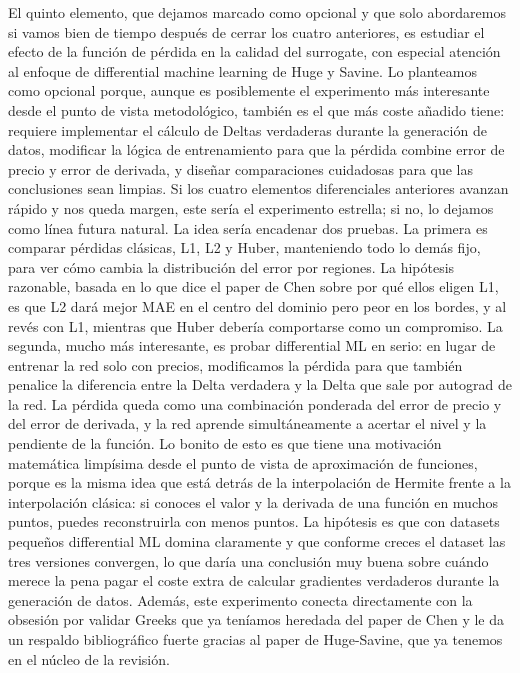 \documentclass[11pt,a4paper]{article}
\begin{document}
El quinto elemento, que dejamos marcado como opcional y que solo abordaremos si vamos bien de tiempo después de cerrar los cuatro anteriores, es estudiar el efecto de la función de pérdida en la calidad del surrogate, con especial atención al enfoque de differential machine learning de Huge y Savine. Lo planteamos como opcional porque, aunque es posiblemente el experimento más interesante desde el punto de vista metodológico, también es el que más coste añadido tiene: requiere implementar el cálculo de Deltas verdaderas durante la generación de datos, modificar la lógica de entrenamiento para que la pérdida combine error de precio y error de derivada, y diseñar comparaciones cuidadosas para que las conclusiones sean limpias. Si los cuatro elementos diferenciales anteriores avanzan rápido y nos queda margen, este sería el experimento estrella; si no, lo dejamos como línea futura natural. La idea sería encadenar dos pruebas. La primera es comparar pérdidas clásicas, L1, L2 y Huber, manteniendo todo lo demás fijo, para ver cómo cambia la distribución del error por regiones. La hipótesis razonable, basada en lo que dice el paper de Chen sobre por qué ellos eligen L1, es que L2 dará mejor MAE en el centro del dominio pero peor en los bordes, y al revés con L1, mientras que Huber debería comportarse como un compromiso. La segunda, mucho más interesante, es probar differential ML en serio: en lugar de entrenar la red solo con precios, modificamos la pérdida para que también penalice la diferencia entre la Delta verdadera y la Delta que sale por autograd de la red. La pérdida queda como una combinación ponderada del error de precio y del error de derivada, y la red aprende simultáneamente a acertar el nivel y la pendiente de la función. Lo bonito de esto es que tiene una motivación matemática limpísima desde el punto de vista de aproximación de funciones, porque es la misma idea que está detrás de la interpolación de Hermite frente a la interpolación clásica: si conoces el valor y la derivada de una función en muchos puntos, puedes reconstruirla con menos puntos. La hipótesis es que con datasets pequeños differential ML domina claramente y que conforme creces el dataset las tres versiones convergen, lo que daría una conclusión muy buena sobre cuándo merece la pena pagar el coste extra de calcular gradientes verdaderos durante la generación de datos. Además, este experimento conecta directamente con la obsesión por validar Greeks que ya teníamos heredada del paper de Chen y le da un respaldo bibliográfico fuerte gracias al paper de Huge-Savine, que ya tenemos en el núcleo de la revisión.
\end{document}
